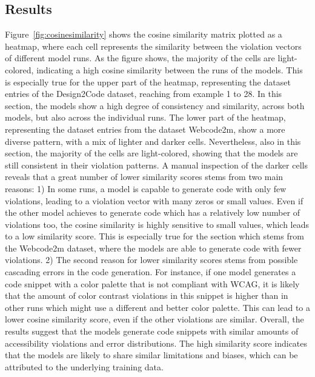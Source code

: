 \subsection{Results}
Figure~\ref{fig:cosinesimilarity} shows the cosine similarity matrix 
plotted as a heatmap, where each cell represents the similarity between 
the violation vectors of different model runs. 
As the figure shows, the majority of the cells 
are light-colored, indicating a high cosine similarity 
between the runs of the models. This is especially true 
for the upper part of the heatmap, representing the 
dataset entries of the Design2Code dataset, reaching 
from example 1 to 28. In this section, the models 
show a high degree of consistency and similarity, across 
both models, but also across the individual runs.
The lower part of the heatmap, representing the
dataset entries from the dataset Webcode2m, show 
a more diverse pattern, with a mix of lighter and 
darker cells. Nevertheless, also in this section, 
the majority of the cells are light-colored, showing
that the models are still consistent in their violation 
patterns. A manual inspection of the darker cells reveals 
that a great number of lower similarity scores stems from 
two main reasons: 1) In some runs, a model is capable 
to generate code with only few violations, leading to 
a violation vector with many zeros or small values. 
Even if the other model achieves to generate code 
which has a relatively low number of violations too, 
the cosine similarity is highly sensitive to 
small values, which leads to a low similarity score. 
This is especially true for the section which stems from 
the Webcode2m dataset, where the models are able to
generate code with fewer violations. 
2) The second reason for lower similarity scores stems 
from possible cascading errors in the code generation. 
For instance, if one model generates a code snippet with
a color palette that is not compliant with WCAG, it 
is likely that the amount of color contrast violations 
in this snippet is higher than in other runs which 
might use a different and better color palette. 
This can lead to a lower cosine similarity score, even
if the other violations are similar.\newline 
Overall, the results suggest that the models generate 
code snippets with similar amounts of accessibility violations
and error distributions. The high similarity score 
indicates that the models are likely to share similar
limitations and biases, which can be attributed to the
underlying training data.

